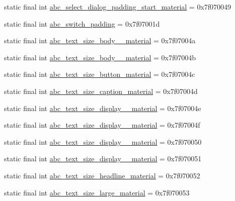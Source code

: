 \begin{CompactItemize}
static final int \hyperlink{classandroid_1_1support_1_1graphics_1_1drawable_1_1_r_1_1dimen_2ed58fb94f5fb11e95738023dd37fdcf}{abc\_\-select\_\-dialog\_\-padding\_\-start\_\-material} = 0x7f070049
\item 
static final int \hyperlink{classandroid_1_1support_1_1graphics_1_1drawable_1_1_r_1_1dimen_c0a4c59b77f050020472098f48b6d3ce}{abc\_\-switch\_\-padding} = 0x7f07001d
\item 
static final int \hyperlink{classandroid_1_1support_1_1graphics_1_1drawable_1_1_r_1_1dimen_e13fa54fe98c2232abfd776c3ce86004}{abc\_\-text\_\-size\_\-body\_\_\-material} = 0x7f07004a
\item 
static final int \hyperlink{classandroid_1_1support_1_1graphics_1_1drawable_1_1_r_1_1dimen_f4d27397469be1b3385ca7c945aee3e8}{abc\_\-text\_\-size\_\-body\_\_\-material} = 0x7f07004b
\item 
static final int \hyperlink{classandroid_1_1support_1_1graphics_1_1drawable_1_1_r_1_1dimen_b3174d068cdd0cf604362af8534afe74}{abc\_\-text\_\-size\_\-button\_\-material} = 0x7f07004c
\item 
static final int \hyperlink{classandroid_1_1support_1_1graphics_1_1drawable_1_1_r_1_1dimen_0400efbf89b44d986e6df556b9e06a44}{abc\_\-text\_\-size\_\-caption\_\-material} = 0x7f07004d
\item 
static final int \hyperlink{classandroid_1_1support_1_1graphics_1_1drawable_1_1_r_1_1dimen_19687f306ab361308a120f8898bc24bc}{abc\_\-text\_\-size\_\-display\_\_\-material} = 0x7f07004e
\item 
static final int \hyperlink{classandroid_1_1support_1_1graphics_1_1drawable_1_1_r_1_1dimen_e47183c781397ee15520787c0ce5a9e7}{abc\_\-text\_\-size\_\-display\_\_\-material} = 0x7f07004f
\item 
static final int \hyperlink{classandroid_1_1support_1_1graphics_1_1drawable_1_1_r_1_1dimen_e8f30e2c67e30953afa4632e87926116}{abc\_\-text\_\-size\_\-display\_\_\-material} = 0x7f070050
\item 
static final int \hyperlink{classandroid_1_1support_1_1graphics_1_1drawable_1_1_r_1_1dimen_2de644d2b3d586d60b51a331a2dcd3f1}{abc\_\-text\_\-size\_\-display\_\_\-material} = 0x7f070051
\item 
static final int \hyperlink{classandroid_1_1support_1_1graphics_1_1drawable_1_1_r_1_1dimen_a56f33b6007d355878a847ea26e0d24b}{abc\_\-text\_\-size\_\-headline\_\-material} = 0x7f070052
\item 
static final int \hyperlink{classandroid_1_1support_1_1graphics_1_1drawable_1_1_r_1_1dimen_22a43cd732c4e3c4a20ff878b342e471}{abc\_\-text\_\-size\_\-large\_\-material} = 0x7f070053

\end{CompactItemize}

